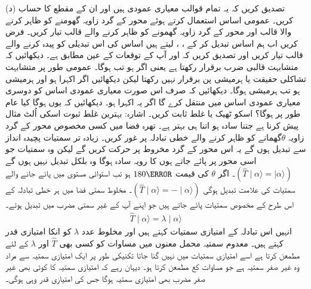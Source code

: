 (د) تصدیق کریں کہ یہ تمام قوالب معیاری عمودی ہیں اور ان کے مقطع کا حساب کریں۔
عمومی اساس  استعمال کرتے ہوئے محور  کے گرد زاویہ  گھومنے کو ظاہر کرنے والا قالب  اور محور  کے گرد زاویہ  گھمونے کو ظاہر کرنے والے قالب  تیار کریں۔ فرض کریں اب ہم اساس تبدیل کر کے ، ،  لیتے ہیں اساس کی اس تبدیلی کو پیدہ کرنے والے قالب تیار کریں اور تصدیق کریں کہ  اور  آپ کے توقعات کے عین مطابق ہے۔
دیکھائیں کہ متشابہت قالبی ضرب برقرار رکھتا ہے یعنی اگر  ہو تب  ہوگا۔ عمومی طور پر متشابہت تشاکلی حقیقت یا ہرمیشی پن برقرار نہیں رکھتا لیکن دیکھائیں اگر  اکہرا ہو اور  ہرمیشی ہو تب  ہرمیشی ہوگا۔ دیکھائیں کہ  صرف اس صورت معیاری عمودی اساس کو دوسری معیاری عمودی اساس میں منتقل کرے گا اگر یہ اکہرا ہو۔
دیکھائیں کہ  یوں  ہوگا کیا عام طور پر  ہوگا؟ اسکو ٹھیک یا غلط ثابت کریں۔ اشارہ: بہترین غلط ثبوت اسکی اُلٹ مثال پیش کرنا ہے جتنا سادہ ہو اتنا ہی بہتر ہے۔
تھرہ فضا میں کسی مخصوص محور کے گرد زاویہ \(\theta\)گھمانے کو ظاہر کرنے والے خطی تبادلہ پر غور کریں۔ زیادہ تر سمتیات پچیدہ انداز سے تبدیل ہوں گے یہ اس محور کے گرد مخروط پر حرکت کریں گے لیکن وہ سمتیات جو اسی محور پر پائے جاتے ہوں کا رویہ سادہ ہوگا وہ بلکل تبدیل نہیں ہوں گے \((\hat{T}\mid \alpha \rangle=\mid \alpha \rangle)\)۔ اگر \(\theta\) کی قیمت \(\num{180}\degree\) ہو تب استوائی مستوی میں پائے جانے والے سمتیات کی علامت تبدیل ہوگی \((\hat{T}\mid \alpha \rangle = -\mid \alpha \rangle)\)۔ مخلوط سمتی فضا میں ہر خطی تبادلہ کے اس طرح کے مخصوص سمتیات پائے جاتے ہیں جو اپنے آپ کے غیر سمتی مضرب میں تبدیل ہوتے۔
\begin{align}
	\hat{T}\mid\alpha\rangle = \lambda\mid\alpha\rangle
\end{align}
انہیں اس تبادلہ کے امتیازی سمتیات کہتے ہیں اور مخلوط عدد \(\lambda\) کو انکا امتیازی قدر کہتے ہیں۔ معدوم سمتیہ محمل معنوں میں مساوات  کو کسی بھی \(\hat{T}\) اور \(\lambda\) کے لئے مطمعن کرتا ہے اسے امتیازی سمتیات میں نہیں گنا جاتا تکنیکی طور پر ایک امتیازی سمتیہ سے مراد وہ غیر صفر سمتیہ ہے جو مساوات  کع مطمعن کرتا ہو۔ دیہان رہے کہ امتیازی سمتیہ کا کوئی بھی غیر صفر مضرب بھی امتیازی سمتیہ ہوگا جس کی امتیازی قدر وہی ہوگی۔

